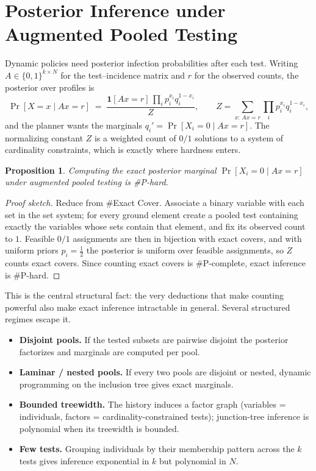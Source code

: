 \documentclass[11pt]{article}
\newtheorem{proposition}{Proposition}
\begin{document}
\section{Posterior Inference under Augmented Pooled Testing}
Dynamic policies need posterior infection probabilities after each test. Writing
$A\in\{0,1\}^{k\times N}$ for the test--incidence matrix and $r$ for the observed
counts, the posterior over profiles is
\[
  \Pr[X=x \mid Ax=r] \;=\;
  \frac{\mathbf{1}[Ax=r]\,\prod_i p_i^{x_i}q_i^{1-x_i}}{Z},
  \qquad
  Z=\!\!\sum_{x:\,Ax=r}\prod_i p_i^{x_i}q_i^{1-x_i},
\]
and the planner wants the marginals $q_i'=\Pr[X_i=0\mid Ax=r]$. The normalizing
constant $Z$ is a weighted count of $0/1$ solutions to a system of cardinality
constraints, which is exactly where hardness enters.

\begin{proposition}\label{prop:sharpP}
Computing the exact posterior marginal $\Pr[X_i=0\mid Ax=r]$ under augmented
pooled testing is \#P-hard.
\end{proposition}
\begin{proof}[Proof sketch]
Reduce from \#Exact Cover. Associate a binary variable with each set in the set
system; for every ground element create a pooled test containing exactly the
variables whose sets contain that element, and fix its observed count to $1$.
Feasible $0/1$ assignments are then in bijection with exact covers, and with
uniform priors $p_i=\tfrac12$ the posterior is uniform over feasible
assignments, so $Z$ counts exact covers. Since counting exact covers is
\#P-complete, exact inference is \#P-hard.
\end{proof}

This is the central structural fact: the very deductions that make counting
powerful also make exact inference intractable in general. Several structured
regimes escape it.
\begin{itemize}
  \item \textbf{Disjoint pools.} If the tested subsets are pairwise disjoint the
  posterior factorizes and marginals are computed per pool.
  \item \textbf{Laminar / nested pools.} If every two pools are disjoint or
  nested, dynamic programming on the inclusion tree gives exact marginals.
  \item \textbf{Bounded treewidth.} The history induces a factor graph (variables
  = individuals, factors = cardinality-constrained tests); junction-tree
  inference is polynomial when its treewidth is bounded.
  \item \textbf{Few tests.} Grouping individuals by their membership pattern
  across the $k$ tests gives inference exponential in $k$ but polynomial in $N$.
\end{itemize}
\end{document}
